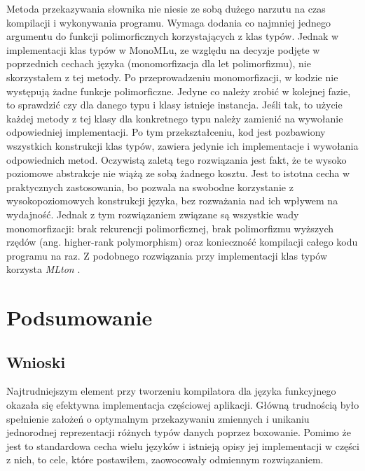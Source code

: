 \documentclass[declaration,shortabstract]{iithesis}
\begin{document}

Metoda przekazywania słownika nie niesie ze sobą dużego narzutu na czas 
kompilacji i wykonywania programu. Wymaga dodania co najmniej
jednego argumentu do funkcji polimorficznych korzystających z klas typów. 
Jednak w implementacji klas typów w MonoMLu, ze względu na decyzje 
podjęte w poprzednich cechach języka (monomorfizacja dla let polimorfizmu), 
nie skorzystałem z tej metody. Po przeprowadzeniu monomorfizacji, w kodzie nie 
występują żadne funkcje polimorficzne. Jedyne co należy zrobić w kolejnej 
fazie, to sprawdzić czy dla danego typu i klasy istnieje instancja. Jeśli tak,
to użycie każdej metody z tej klasy dla konkretnego typu należy zamienić 
na wywołanie odpowiedniej implementacji. Po tym przekształceniu, kod jest 
pozbawiony wszystkich konstrukcji klas typów, zawiera jedynie ich 
implementacje i wywołania odpowiednich metod. Oczywistą zaletą tego rozwiązania
jest fakt, że te wysoko poziomowe abstrakcje nie wiążą ze sobą żadnego kosztu.
Jest to istotna cecha w praktycznych zastosowania, bo pozwala na swobodne 
korzystanie z wysokopoziomowych konstrukcji języka, bez rozważania nad ich 
wpływem na wydajność. Jednak z tym rozwiązaniem związane są wszystkie wady 
monomorfizacji: brak rekurencji polimorficznej, brak polimorfizmu wyższych 
rzędów (ang. higher-rank polymorphism) oraz konieczność kompilacji całego kodu 
programu na raz. Z podobnego rozwiązania przy implementacji klas typów 
korzysta \textit{MLton} \cite{okmij}.



\chapter{Podsumowanie}

\section{Wnioski}
Najtrudniejszym element przy tworzeniu kompilatora dla języka funkcyjnego 
okazała się efektywna implementacja częściowej aplikacji. Główną trudnością
było spełnienie założeń o optymalnym przekazywaniu zmiennych i unikaniu 
jednorodnej reprezentacji różnych typów danych poprzez boxowanie. Pomimo że 
jest to standardowa cecha wielu języków i istnieją opisy jej implementacji
w części z nich, to cele, które postawiłem, zaowocowały odmiennym rozwiązaniem.
\end{document}
